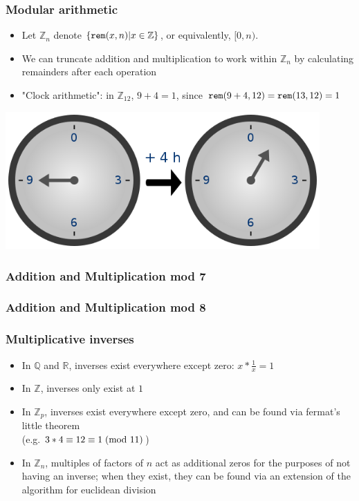 \documentclass{beamer}
\begin{document}
\begin{frame}[fragile]
\frametitle{Modular arithmetic}
\begin{itemize}
\item Let $\mathbb Z_n$ denote $\{ \verb|rem|(x, n) | x \in \mathbb Z \}$, or equivalently, $[0, n)$.
\item We can truncate addition and multiplication to work within $\mathbb Z_n$ by calculating remainders after each operation
\item {\scriptsize "Clock arithmetic": in $\mathbb Z_{12}$, $9 + 4 = 1$, since $\verb|rem|(9+4, 12) = \verb|rem|(13, 12) = 1$}
\end{itemize}
\includegraphics[width=0.9\textwidth]{diagrams/560px-Clock_group.png}\\
\end{frame}

\begin{frame}[fragile]
\frametitle{Addition and Multiplication mod 7}
\hspace{0.5cm}
\end{frame}

\begin{frame}[fragile]
\frametitle{Addition and Multiplication mod 8}
\hspace{0.5cm}
\end{frame}

\begin{frame}[fragile]
\frametitle{Multiplicative inverses}
\begin{itemize}
\item In $\mathbb Q$ and $\mathbb R$, inverses exist everywhere except zero: $x * \frac{1}{x} = 1$
\item In $\mathbb Z$, inverses only exist at $1$
\item In $\mathbb Z_p$, inverses exist everywhere except zero, and can be found via fermat's little theorem\\ (e.g. $3*4 \equiv 12 \equiv 1\hspace{1mm}(\text{mod }11)$)
\item In $\mathbb Z_n$, multiples of factors of $n$ act as additional zeros for the purposes of not having an inverse; when they exist, they can be found via an extension of the algorithm for euclidean division
\end{itemize}
\end{frame}
\end{document}
